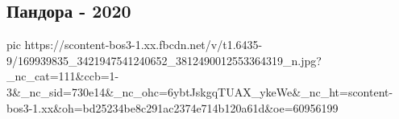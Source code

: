  
 
 
 
 

\subsection{Пандора - 2020}
\label{sec:07_04_2021.fb.levchenko_tatjana.1.pandora}


\ifcmt
  pic https://scontent-bos3-1.xx.fbcdn.net/v/t1.6435-9/169939835_3421947541240652_3812490012553364319_n.jpg?_nc_cat=111&ccb=1-3&_nc_sid=730e14&_nc_ohc=6ybtJskgqTUAX_ykeWe&_nc_ht=scontent-bos3-1.xx&oh=bd25234be8c291ac2374e714b120a61d&oe=60956199
\fi

